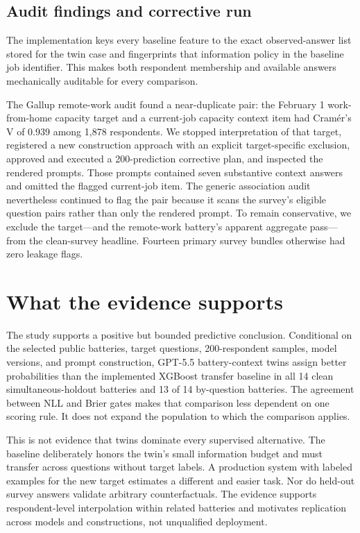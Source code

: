 \documentclass[11pt]{article}
\begin{document}
\subsection{Audit findings and corrective run}
The implementation keys every baseline feature to the exact observed-answer
list stored for the twin case and fingerprints that information policy in the
baseline job identifier. This makes both respondent membership and available
answers mechanically auditable for every comparison.

The Gallup remote-work audit found a near-duplicate pair: the February 1
work-from-home capacity target and a current-job capacity context item had
Cramér's V of 0.939 among 1,878 respondents. We stopped interpretation of that
target, registered a new construction approach with an explicit target-specific
exclusion, approved and executed a 200-prediction corrective plan, and inspected
the rendered prompts. Those prompts contained seven substantive context
answers and omitted the flagged current-job item. The generic association
audit nevertheless continued to flag the pair because it scans the survey's
eligible question pairs rather than only the rendered prompt. To remain
conservative, we exclude the target---and the remote-work battery's apparent
aggregate pass---from the clean-survey headline. Fourteen primary survey
bundles otherwise had zero leakage flags.

\section{What the evidence supports}
The study supports a positive but bounded predictive conclusion. Conditional
on the selected public batteries, target questions, 200-respondent samples,
model versions, and prompt construction, GPT-5.5 battery-context twins assign
better probabilities than the implemented XGBoost transfer baseline in all 14
clean simultaneous-holdout batteries and 13 of 14 by-question batteries. The
agreement between NLL and Brier gates makes that comparison less dependent on
one scoring rule. It does not expand the population to which the comparison
applies.

This is not evidence that twins dominate every supervised alternative. The
baseline deliberately honors the twin's small information budget and must
transfer across questions without target labels. A production system with
labeled examples for the new target estimates a different and easier task.
Nor do held-out survey answers validate arbitrary counterfactuals. The evidence
supports respondent-level interpolation within related batteries and motivates
replication across models and constructions, not unqualified deployment.
\end{document}
